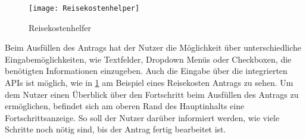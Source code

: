 \begin{figure}[h]
  \centering
    \texttt{[image: Reisekostenhelper]}
    \caption{Reisekostenhelfer}\label{Reisekostenhelfer}
\end{figure}


Beim Ausfüllen des Antrags hat der Nutzer die Möglichkeit über unterschiedliche Eingabemöglichkeiten, wie Textfelder, Dropdown Menüs oder Checkboxen, die benötigten Informationen einzugeben. Auch die Eingabe über die integrierten APIs ist möglich, wie in \ref{Reisekostenhelfer} am Beispiel eines Reisekosten Antrags zu sehen. Um dem Nutzer einen Überblick über den Fortschritt beim Ausfüllen des Antrags zu ermöglichen, befindet sich am oberen Rand des Hauptinhalts eine Fortschrittsanzeige. So soll der Nutzer darüber informiert werden, wie viele Schritte noch nötig sind, bis der Antrag fertig bearbeitet ist. 



